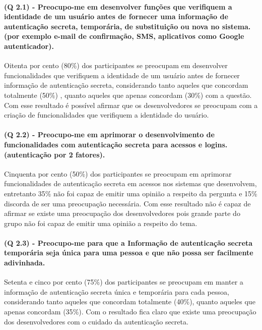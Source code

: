 \paragraph{\textbf{(Q 2.1)} - Preocupo-me em desenvolver funções que verifiquem a identidade de um usuário antes de fornecer uma informação de autenticação secreta, temporária, de substituição ou nova no sistema. (por exemplo e-mail de confirmação, SMS, aplicativos como Google autenticador).}

Oitenta por cento (80{\%}) dos participantes se preocupam em desenvolver funcionalidades que verifiquem a identidade de um usuário antes de fornecer informação de autenticação secreta, considerando tanto aqueles que concordam totalmente (50{\%}) , quanto aqueles que apenas concordam (30{\%}) com a questão. Com esse resultado é possível afirmar que os desenvolvedores se preocupam com a criação de funcionalidades que verifiquem a identidade do usuário.

\paragraph{\textbf{(Q 2.2)} - Preocupo-me em aprimorar o desenvolvimento de funcionalidades com autenticação secreta para acessos e logins. (autenticação por 2 fatores).}

Cinquenta por cento (50{\%}) dos participantes se preocupam em aprimorar funcionalidades de autenticação secreta em acessos nos sistemas que desenvolvem, entretanto 35{\%} não foi capaz de emitir uma opinião a respeito da pergunta e 15{\%} discorda de ser uma preocupação necessária. Com esse resultado não é capaz de afirmar se existe uma preocupação dos desenvolvedores pois grande parte do grupo não foi capaz de emitir uma opinião a respeito do tema.

\paragraph{\textbf{(Q 2.3)} - Preocupo-me para que a Informação de autenticação secreta temporária seja única para uma pessoa e que não possa ser facilmente adivinhada.}

Setenta e cinco por cento (75{\%}) dos participantes se preocupam em manter a informação de autenticação secreta única e temporária para cada pessoa, considerando tanto aqueles que concordam totalmente (40{\%}), quanto aqueles que apenas concordam (35{\%}). Com o resultado fica claro que existe uma preocupação dos desenvolvedores com o cuidado da autenticação secreta.


